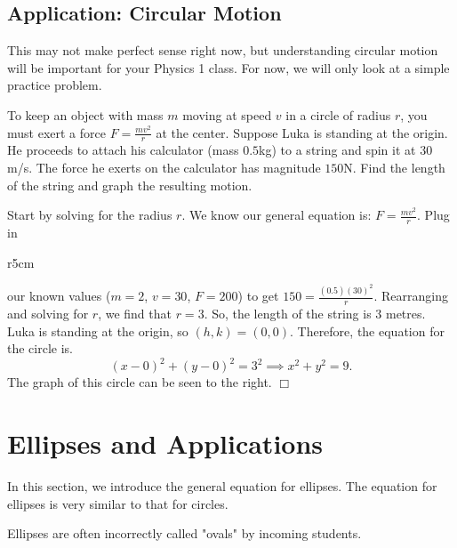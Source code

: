 \documentclass[lang=en,11pt]{elegantbook}
\begin{document}
\subsection{Application: Circular Motion}
\noindent This may not make perfect sense right now, but understanding circular motion will be important for your Physics 1 class.  For now, we will only look at a simple practice problem.
\begin{example}
To keep an object with mass $m$ moving at speed $v$ in a circle of radius $r$, you must exert a force $F = \frac{mv^2}{r}$ at the center.  Suppose Luka is standing at the origin.  He proceeds to attach his calculator (mass $0.5$kg) to a string and spin it at $30$m/s.  The force he exerts on the calculator has magnitude $150$N.  Find the length of the string and graph the resulting motion.
\end{example}
\begin{solution}
Start by solving for the radius $r$.  We know our general equation is: $F = \frac{mv^2}{r}$.  Plug in 
\end{solution}

\begin{wrapfigure}{r}{5cm}
\end{wrapfigure}

\noindent our known values ($m=2$, $v=30$, $F=200$) to get  $150 = \frac{(0.5)(30)^2}{r}$.  Rearranging and solving for $r$, we find that $r=3$.
So, the length of the string is $3$ metres.  Luka is standing at the origin, so $(h,k)=(0,0)$.  Therefore, the equation for the circle is.
$$ (x-0)^2 + (y-0)^2 = 3^2\implies x^2+y^2 = 9.$$
The graph of this circle can be seen to the right. $\Box$

\section{Ellipses and Applications}
\noindent In this section, we introduce the general equation for ellipses.  The equation for ellipses is very similar to that for circles. 

\begin{remark}
Ellipses are often incorrectly called "ovals" by incoming students.
\end{remark}
\end{document}
